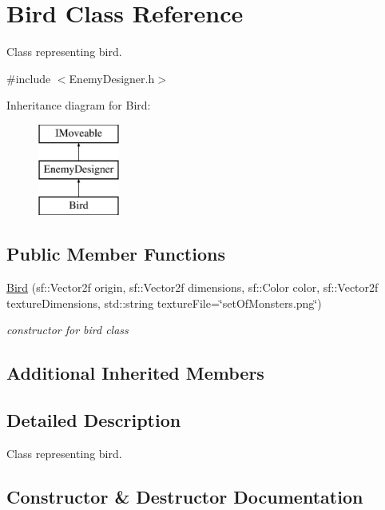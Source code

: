 \hypertarget{class_bird}{}\section{Bird Class Reference}
\label{class_bird}


Class representing bird.  




{\ttfamily \#include $<$Enemy\+Designer.\+h$>$}

Inheritance diagram for Bird\+:\begin{figure}[H]
\begin{center}
\leavevmode
\includegraphics[height=3.000000cm]{class_bird}
\end{center}
\end{figure}
\subsection*{Public Member Functions}
\begin{DoxyCompactItemize}
\item 
\mbox{\hyperlink{class_bird_a8ada8cfd5d414ab4730651c37f86e348}{Bird}} (sf\+::\+Vector2f origin, sf\+::\+Vector2f dimensions, sf\+::\+Color color, sf\+::\+Vector2f texture\+Dimensions, std\+::string texture\+File=\char`\"{}set\+Of\+Monsters.\+png\char`\"{})
\begin{DoxyCompactList}\small\item\em constructor for bird class \end{DoxyCompactList}\end{DoxyCompactItemize}
\subsection*{Additional Inherited Members}


\subsection{Detailed Description}
Class representing bird. 

\subsection{Constructor \& Destructor Documentation}
\mbox{\label{class_bird_a8ada8cfd5d414ab4730651c37f86e348}} 
